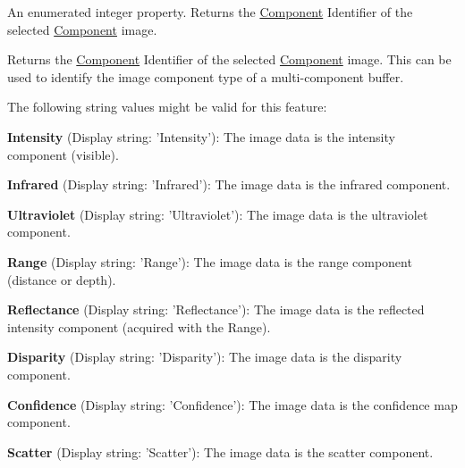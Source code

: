 An enumerated integer property. Returns the \hyperlink{classmv_i_m_p_a_c_t_1_1acquire_1_1_component}{Component} Identifier of the selected \hyperlink{classmv_i_m_p_a_c_t_1_1acquire_1_1_component}{Component} image. 

Returns the \hyperlink{classmv_i_m_p_a_c_t_1_1acquire_1_1_component}{Component} Identifier of the selected \hyperlink{classmv_i_m_p_a_c_t_1_1acquire_1_1_component}{Component} image. This can be used to identify the image component type of a multi-\/component buffer.

The following string values might be valid for this feature\+:
\begin{DoxyItemize}
\item {\bfseries Intensity} (Display string\+: 'Intensity')\+: The image data is the intensity component (visible).
\item {\bfseries Infrared} (Display string\+: 'Infrared')\+: The image data is the infrared component.
\item {\bfseries Ultraviolet} (Display string\+: 'Ultraviolet')\+: The image data is the ultraviolet component.
\item {\bfseries Range} (Display string\+: 'Range')\+: The image data is the range component (distance or depth).
\item {\bfseries Reflectance} (Display string\+: 'Reflectance')\+: The image data is the reflected intensity component (acquired with the Range).
\item {\bfseries Disparity} (Display string\+: 'Disparity')\+: The image data is the disparity component.
\item {\bfseries Confidence} (Display string\+: 'Confidence')\+: The image data is the confidence map component.
\item {\bfseries Scatter} (Display string\+: 'Scatter')\+: The image data is the scatter component.
\end{DoxyItemize}

